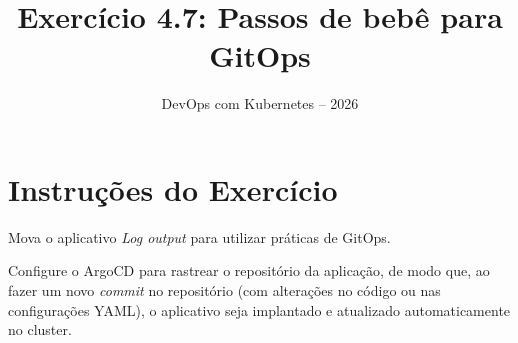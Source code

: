 \documentclass[11pt,a4paper]{article}
\title{\color{secondary}\Huge\textbf{Exercício 4.7: Passos de bebê para GitOps}}
\author{\color{primary}DevOps com Kubernetes -- 2026}
\date{}
\begin{document}
\maketitle

\section*{\color{primary}Instruções do Exercício}
\begin{tcolorbox}[colback=blue!5!white,colframe=blue!75!black,title=Exercício 4.7: Passos de bebê para GitOps]
Mova o aplicativo \textit{Log output} para utilizar práticas de GitOps. 

Configure o ArgoCD para rastrear o repositório da aplicação, de modo que, ao fazer um novo \textit{commit} no repositório (com alterações no código ou nas configurações YAML), o aplicativo seja implantado e atualizado automaticamente no cluster.
\end{tcolorbox}
\end{document}
